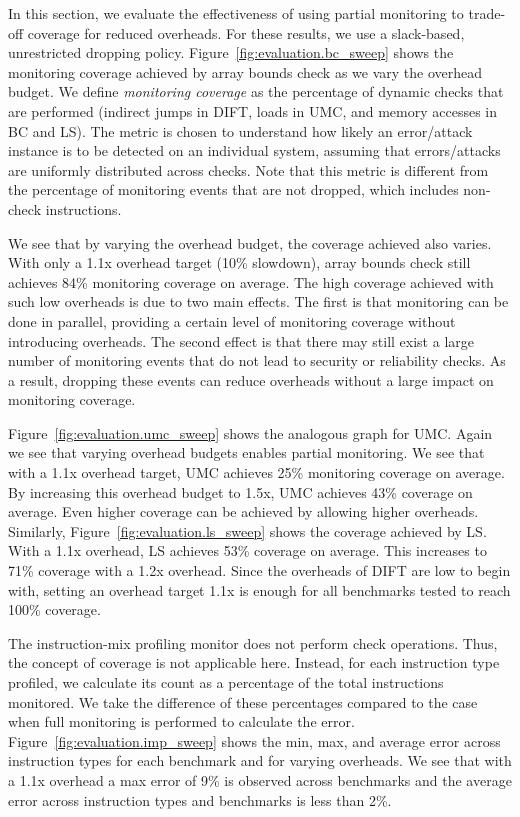 In this section, we evaluate the effectiveness of
using partial monitoring to trade-off coverage for reduced overheads.
For these results, we use a slack-based, unrestricted dropping policy.
Figure~\ref{fig:evaluation.bc_sweep} shows the monitoring coverage achieved by
array bounds check as we vary the overhead budget. 
We define \emph{monitoring coverage} as the 
percentage of dynamic checks that are performed 
(indirect jumps in DIFT, loads in UMC, and memory accesses in BC and LS). 
The metric is chosen to understand
how likely an error/attack instance is to be detected on an individual system, 
assuming that errors/attacks are uniformly distributed across checks. 
Note that this metric is different from the
percentage of monitoring events that are not dropped, which includes
non-check instructions.

We see that by varying the overhead budget, the coverage achieved also varies.
With only a 1.1x overhead target (10\% slowdown), array bounds check still
achieves 84\% monitoring coverage on average. The high coverage
achieved with such low overheads is due to two main effects.  The first is that
monitoring can be done in parallel, providing a certain level of monitoring coverage without
introducing overheads. The second effect is that there may still exist a large number of
monitoring events that do not lead to security or reliability checks. As a
result, dropping these events can reduce overheads without a large impact on
monitoring coverage.

Figure~\ref{fig:evaluation.umc_sweep} shows the analogous graph for UMC. Again
we see that varying overhead budgets enables partial monitoring. We see that
with a 1.1x overhead target, UMC achieves 25\% monitoring coverage on average.
By increasing this overhead budget to 1.5x, UMC achieves 43\% coverage on
average. Even higher coverage can be achieved by allowing higher overheads.
Similarly, Figure~\ref{fig:evaluation.ls_sweep} shows the coverage achieved by LS.
With a 1.1x overhead, LS achieves 53\% coverage on average. This increases to
71\% coverage with a 1.2x overhead. 
Since the overheads of DIFT are low to begin with, setting an overhead target
1.1x is enough for all benchmarks tested to reach 100\% coverage.

The instruction-mix profiling monitor does not perform check operations. Thus,
the concept of coverage is not applicable here. Instead, for each instruction
type profiled, we calculate its count as a percentage of the total instructions
monitored. We take the difference of these percentages compared to the case
when full monitoring
is performed to calculate the error. Figure~\ref{fig:evaluation.imp_sweep}
shows the min, max, and average error across
instruction types for each benchmark and for varying overheads. We see that
with a 1.1x overhead a max error of 9\% is observed across benchmarks and the
average error across instruction types and benchmarks is less than 2\%. 


